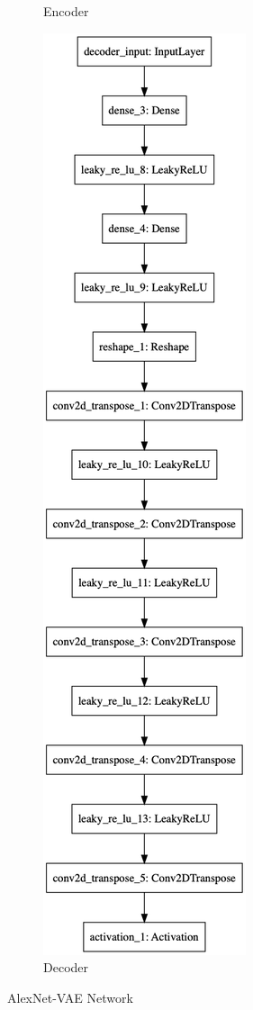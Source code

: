 \begin{figure}
\begin{subfigure}{.5\textwidth}
        \caption{Encoder}
    \end{subfigure}%
    \begin{subfigure}{.5\textwidth}
        \centering
        \includegraphics[width=\textwidth,height=.9\textheight,keepaspectratio]{images/alexnet-vae/decoder.png}
        \caption{Decoder}
    \end{subfigure}
    \caption{AlexNet-VAE Network}
    \label{fig:alexnet-vae-encoder}
\end{figure}

